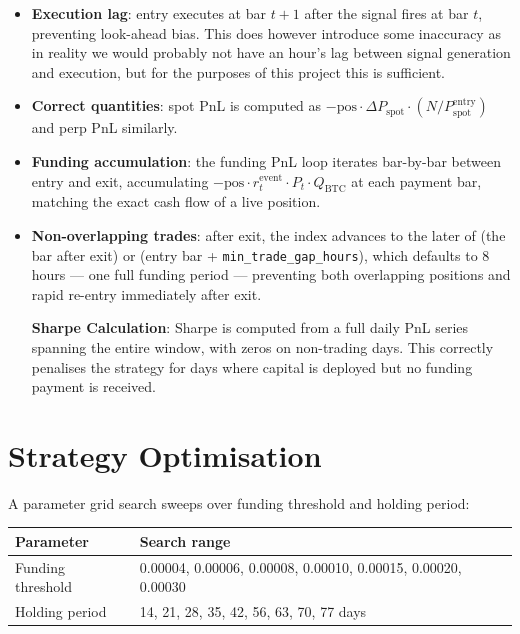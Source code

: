 \documentclass[11pt,a4paper]{article}
\begin{document}
\begin{itemize}[leftmargin=1.5em, itemsep=2pt]
    \item \textbf{Execution lag}: entry executes at bar $t+1$ after the
          signal fires at bar $t$, preventing look-ahead bias. This does however introduce some inaccuracy as in reality we would probably not have an hour's lag between signal generation and execution, but for the purposes of this project this is sufficient.
    \item \textbf{Correct quantities}: spot PnL is computed as
          $-\text{pos} \cdot \Delta P_{\text{spot}} \cdot (N / P_{\text{spot}}^{\text{entry}})$
          and perp PnL similarly. 
    \item \textbf{Funding accumulation}: the funding PnL loop iterates
          bar-by-bar between entry and exit, accumulating
          $-\text{pos} \cdot r_t^{\text{event}} \cdot P_t \cdot Q_{\text{BTC}}$
          at each payment bar, matching the exact cash flow of a live position. \item \textbf{Non-overlapping trades}: after exit, the index advances to the later of (the bar after exit) or (entry bar + \texttt{min\_trade\_gap\_hours}), which defaults to 8 hours --- one full funding period --- preventing both overlapping positions and rapid re-entry immediately after exit. 
          
          \textbf{Sharpe Calculation}: Sharpe is computed from a full daily PnL series spanning the entire window, with zeros on non-trading days. This correctly penalises the strategy for days where capital is deployed but no funding payment is received.
          
          \end{itemize}
          
        


\section{Strategy Optimisation}

A parameter grid search sweeps over funding threshold and holding period:

\begin{center}
\begin{tabular}{ll}
\toprule
\textbf{Parameter} & \textbf{Search range} \\
\midrule
Funding threshold & 0.00004, 0.00006, 0.00008, 0.00010, 0.00015, 0.00020, 0.00030 \\
Holding period & 14, 21, 28, 35, 42, 56, 63, 70, 77 days \\
\bottomrule
\end{tabular}
\end{center}
\end{document}
